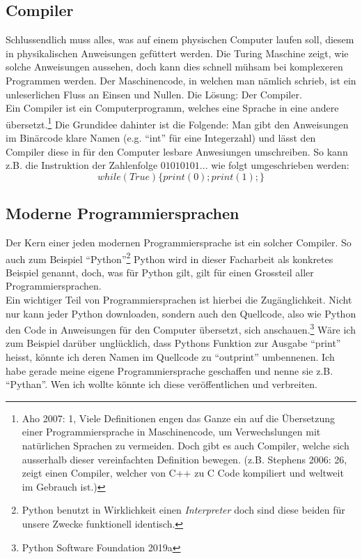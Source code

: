 \documentclass[10pt,a4paper]{article}
\begin{document}
\subsection{Compiler}
Schlussendlich muss alles, was auf einem physischen Computer laufen soll, diesem in physikalischen Anweisungen gefüttert werden. Die Turing Maschine zeigt, wie solche Anweisungen aussehen, doch kann dies schnell mühsam bei komplexeren Programmen werden. Der Maschinencode, in welchen man nämlich schrieb, ist ein unleserlichen Fluss an Einsen und Nullen. Die Lösung: Der Compiler. \\
Ein Compiler ist ein Computerprogramm, welches eine Sprache in eine andere übersetzt.\footnote{Aho 2007: 1, Viele Definitionen engen das Ganze ein auf die Übersetzung einer Programmiersprache in Maschinencode, um Verwechslungen mit natürlichen Sprachen zu vermeiden. Doch gibt es auch Compiler, welche sich ausserhalb dieser vereinfachten Definition bewegen. (z.B. Stephens 2006: 26, zeigt einen Compiler, welcher von C++ zu C Code kompiliert und weltweit im Gebrauch ist.)} Die Grundidee dahinter ist die Folgende: Man gibt den Anweisungen im Binärcode klare Namen (e.g. \enquote{int} für eine Integerzahl) und lässt den Compiler diese in für den Computer lesbare Anwesiungen umschreiben. So kann z.B. die Instruktion der Zahlenfolge $01010101...$ wie folgt umgeschrieben werden: 
$$ while (True) \{ print(0); print(1);\} $$

\subsection{Moderne Programmiersprachen}
Der Kern einer jeden modernen Programmiersprache ist ein solcher Compiler. So auch zum Beispiel \enquote{Python}\footnote{Python benutzt in Wirklichkeit einen \textit{Interpreter} doch sind diese beiden für unsere Zwecke funktionell identisch.} Python wird in dieser Facharbeit als konkretes Beispiel genannt, doch, was für Python gilt, gilt für einen Grossteil aller Programmiersprachen.\\
Ein wichtiger Teil von Programmiersprachen ist hierbei die Zugänglichkeit. Nicht nur kann jeder Python downloaden, sondern auch den Quellcode, also wie Python den Code in Anweisungen für den Computer übersetzt, sich anschauen.\footnote{Python Software Foundation 2019a} Wäre ich zum Beispiel darüber unglücklich, dass Pythons Funktion zur Ausgabe \enquote{print} heisst, könnte ich deren Namen im Quellcode zu \enquote{outprint} umbennenen. Ich habe gerade meine eigene Programmiersprache geschaffen und nenne sie z.B. \enquote{Pythan}. Wen ich wollte könnte ich diese veröffentlichen und verbreiten.
\end{document}
